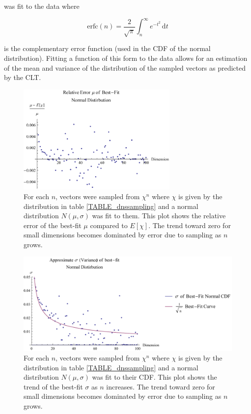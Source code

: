 \documentclass[12pt]{report}
\theoremstyle{remark}
\theoremstyle{definition}
\theoremstyle{definition}
\theoremstyle{definition}
\begin{document}
was fit to the data where 

\begin{equation}
\textrm{erfc}(n)=\frac{2}{\sqrt{\pi}} \int_n^{\infty}
e^{-t^2}\,\mathrm dt
\end{equation}

is the complementary error function (used in the CDF of the normal
distribution). Fitting a function of this form to the data allows for an estimation
of the mean and variance of the distribution of the sampled vectors as predicted
by the CLT.

\begin{figure}
\centering
\includegraphics[width=0.7\textwidth]{../figures/dnssampling-muerror.pdf}
\caption[Relative Error of $\mu$ of Best-Fit Normal Distribution of Sampled Expected Value]
{For each $n$, vectors were sampled from $\chi^n$ where $\chi$ is given by the
distribution in table \ref{TABLE_dnssampling} and a normal distribution
$N(\mu,\sigma)$ was fit to them. This plot shows the relative error of the
best-fit $\mu$ compared to $E[\chi]$. The trend toward zero for small dimensions
becomes dominated by error due to sampling as $n$ grows.}
\label{dnssampling-muerror}
\end{figure}

\begin{figure}
\centering
\includegraphics[width=\textwidth]{../figures/dnssampling-sigmafit.pdf}
\caption[Trend of $\sigma$ of Best-Fit Normal Distribution of Sampled Expected Value]
{For each $n$, vectors were sampled from $\chi^n$ where $\chi$ is given by the
distribution in table \ref{TABLE_dnssampling} and a normal distribution
$N(\mu,\sigma)$ was fit to their CDF. This plot shows the trend of the best-fit
$\sigma$ as $n$ increases. The trend toward zero for small dimensions becomes
dominated by error due to sampling as $n$ grows.}
\label{dnssampling-sigmafit}
\end{figure}
\end{document}
